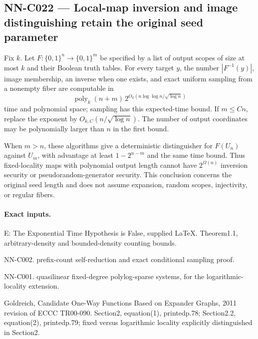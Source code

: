 \subsection{NN-C022 --- Local-map inversion and image distinguishing retain the original seed parameter}
\begin{proposition}[NN-C022]
Fix $k$. Let $F:\{0,1\}^n\to\{0,1\}^m$ be specified by a list of output scopes of size at most $k$ and their Boolean truth tables. For every target $y$, the number $|F^{-1}(y)|$, image membership, an inverse when one exists, and exact uniform sampling from a nonempty fiber are computable in
\[
 \operatorname{poly}_k(n+m)\,
 2^{O_k(n\log\log n/\sqrt{\log n})}
\]
time and polynomial space; sampling has this expected-time bound. If $m\leq Cn$, replace the exponent by $O_{k,C}(n/\sqrt{\log n})$. The number of output coordinates may be polynomially larger than $n$ in the first bound.

When $m>n$, these algorithms give a deterministic distinguisher for $F(U_n)$ against $U_m$, with advantage at least $1-2^{n-m}$ and the same time bound. Thus fixed-locality maps with polynomial output length cannot have $2^{\Omega(n)}$ inversion security or pseudorandom-generator security. This conclusion concerns the original seed length and does not assume expansion, random scopes, injectivity, or regular fibers.
\end{proposition}
\paragraph{Exact inputs.}
E: The Exponential Time Hypothesis is False, supplied LaTeX. Theorem1.1, arbitrary-density and bounded-density counting bounds.

NN-C002. prefix-count self-reduction and exact conditional sampling proof.

NN-C001. quasilinear fixed-degree polylog-sparse systems, for the logarithmic-locality extension.

Goldreich, Candidate One-Way Functions Based on Expander Graphs, 2011 revision of ECCC TR00-090. Section2, equation(1), printedp.78; Section2.2, equation(2), printedp.79; fixed versus logarithmic locality explicitly distinguished in Section2.


